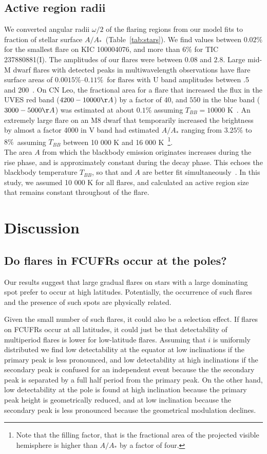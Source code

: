 \documentclass[fleqn,usenatbib,letters]{mnras}%
\newcommand{\FC}{TIC 237880881} %
\newcommand{\FE}{KIC 100004076} %
\begin{document}
\subsection{Active region radii}
We converted angular radii $\omega/2$ of the flaring regions from our model fits to fraction of stellar surface $A/A_*$~(Table~\ref{tab:stars}). We find values between $0.02\%$ for the smallest flare on \FE, and more than $6\%$ for \FC (I). The amplitudes of our flares were between $0.08$ and $2.8$. Large mid-M dwarf flares with detected peaks in multiwavelength observations have flare surface areas of $0.0015\%–0.11\%$~for flares with U band amplitudes between .5 and 200~\citep{kowalski2013}. On CN Leo, the fractional area for a flare that increased the flux in the UVES red band ($4200-10000\AA$) by a factor of 40, and $550$ in the blue band ($3000-5000\AA$) was estimated at about $0.1\%$ assuming $T_{BB}=10 000$ K~\citep{fuhrmeister2008}. An extremely large flare on an M8 dwarf that temporarily increased the brightness by almost a factor 4000 in V band had estimated $A/A_*$ ranging from $3.25\%$ to $8\%$~assuming $T_{BB}$ between 10 000 K and 16 000 K~\citep{schmidt2014}\footnote{Note that the filling factor, that is the fractional area of the projected visible hemisphere is higher than $A/A_*$ by a factor of four.}. 
\\
The area $A$ from which the blackbody emission originates increases during the rise phase, and is approximately constant during the decay phase. This echoes the blackbody temperature $T_{BB}$, so that and $A$ are better fit simultaneously~\citep{kowalski2013}. In this study, we assumed 10 000 K for all flares, and calculated an active region size that remains constant throughout of the flare.
\section{Discussion}
\label{sec:discussion}

\subsection{Do flares in FCUFRs occur at the poles?}
Our results suggest that large gradual flares on stars with a large dominating spot prefer to occur at high latitudes. Potentially, the occurrence of such flares and the presence of such spots are physically related.

Given the small number of such flares, it could also be a selection effect. If flares on FCUFRs occur at all latitudes, it could just be that detectability of multiperiod flares is lower for low-latitude flares. Assuming that $i$ is uniformly distributed we find low detectability at the equator at low inclinations if the primary peak is less pronounced, and low detectability at high inclinations if the secondary peak is confused for an independent event because the the secondary peak is separated by a full half period from the primary peak. On the other hand, low detectability at the pole is found at high inclination because the primary peak height is geometrically reduced, and at low inclination because the secondary peak is less pronounced because the geometrical modulation declines.
\end{document}
